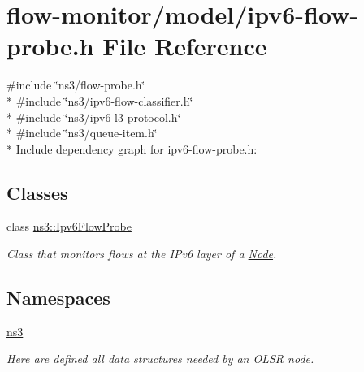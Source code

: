 \hypertarget{ipv6-flow-probe_8h}{}\section{flow-\/monitor/model/ipv6-\/flow-\/probe.h File Reference}
\label{ipv6-flow-probe_8h}
{\ttfamily \#include \char`\"{}ns3/flow-\/probe.\+h\char`\"{}}\\*
{\ttfamily \#include \char`\"{}ns3/ipv6-\/flow-\/classifier.\+h\char`\"{}}\\*
{\ttfamily \#include \char`\"{}ns3/ipv6-\/l3-\/protocol.\+h\char`\"{}}\\*
{\ttfamily \#include \char`\"{}ns3/queue-\/item.\+h\char`\"{}}\\*
Include dependency graph for ipv6-\/flow-\/probe.h\+:
\subsection*{Classes}
\begin{DoxyCompactItemize}
\item 
class \hyperlink{classns3_1_1Ipv6FlowProbe}{ns3\+::\+Ipv6\+Flow\+Probe}
\begin{DoxyCompactList}\small\item\em Class that monitors flows at the I\+Pv6 layer of a \hyperlink{classns3_1_1Node}{Node}. \end{DoxyCompactList}\end{DoxyCompactItemize}
\subsection*{Namespaces}
\begin{DoxyCompactItemize}
\item 
 \hyperlink{namespacens3}{ns3}
\begin{DoxyCompactList}\small\item\em Here are defined all data structures needed by an O\+L\+SR node. \end{DoxyCompactList}\end{DoxyCompactItemize}
